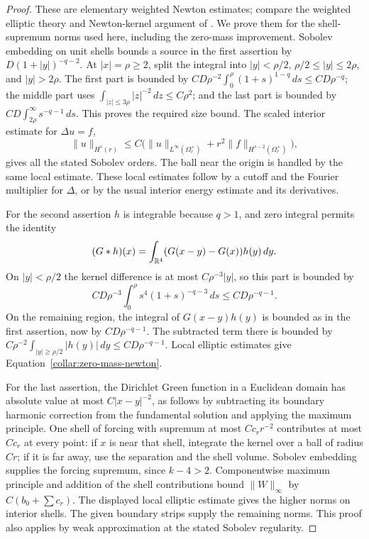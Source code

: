 \begin{proof}
These are elementary weighted Newton estimates; compare the weighted
elliptic theory and Newton-kernel argument of
\cite[Theorem~1.7]{Bartnik1986}. We prove them for the shell-supremum
norms used here, including the zero-mass improvement.
Sobolev embedding on unit shells bounds a source in the first
assertion by \(D(1+|y|)^{-q-2}\).  At \(|x|=\rho\ge2\), split
the integral into \(|y|<\rho/2\),
\(\rho/2\le |y|\le2\rho\), and \(|y|>2\rho\).
The first part is bounded by
\(CD\rho^{-2}\int_0^\rho(1+s)^{1-q}\,ds\le CD\rho^{-q}\);
the middle part uses
\(\int_{|z|\le3\rho}|z|^{-2}\,dz\le C\rho^2\);
and the last part is bounded by
\(CD\int_{2\rho}^\infty s^{-q-1}\,ds\).
This proves the required size bound.  The scaled interior estimate
for \(\Delta u=f\),
\[
 \|u\|_{H^s(r)}\le
 C\bigl(\|u\|_{L^\infty(\Omega_r^+)}
          +r^2\|f\|_{H^{s-2}(\Omega_r^+)}\bigr),
\]
gives all the stated Sobolev orders.  The ball near the origin is
handled by the same local estimate.  These local estimates follow
by a cutoff and the Fourier multiplier for \(\Delta\), or by the
usual interior energy estimate and its derivatives.

For the second assertion \(h\) is integrable because \(q>1\), and
zero integral permits the identity
\[
 (G*h)(x)=\int_{\mathbb{R}^4}(G(x-y)-G(x))h(y)\,dy.
\]
On \(|y|<\rho/2\) the kernel difference is at most
\(C\rho^{-3}|y|\), so this part is bounded by
\[
 CD\rho^{-3}\int_0^\rho s^4(1+s)^{-q-3}\,ds
       \le CD\rho^{-q-1}.
\]
On the remaining region, the integral of \(G(x-y)h(y)\) is bounded
as in the first assertion, now by \(CD\rho^{-q-1}\).  The
subtracted term there is bounded by
\(C\rho^{-2}\int_{|y|\ge\rho/2}|h(y)|\,dy
 \le CD\rho^{-q-1}\).
Local elliptic estimates give Equation~\eqref{collar:zero-mass-newton}.

For the last assertion, the Dirichlet Green function in a Euclidean
domain has absolute value at most \(C|x-y|^{-2}\), as follows by
subtracting its boundary harmonic correction from the fundamental
solution and applying the maximum principle.  One shell of forcing
with supremum at most \(Cc_rr^{-2}\) contributes at most \(Cc_r\)
at every point: if \(x\) is near that shell, integrate the kernel
over a ball of radius \(Cr\); if it is far away, use the separation
and the shell volume.  Sobolev embedding supplies the forcing
supremum, since \(k-4>2\).  Componentwise maximum principle and
addition of the shell contributions bound \(\|W\|_\infty\) by
\(C(b_0+\sum c_r)\).  The displayed local elliptic estimate gives
the higher norms on interior shells.  The given boundary strips
supply the remaining norms.  This proof also applies by weak
approximation at the stated Sobolev regularity.
\end{proof}

